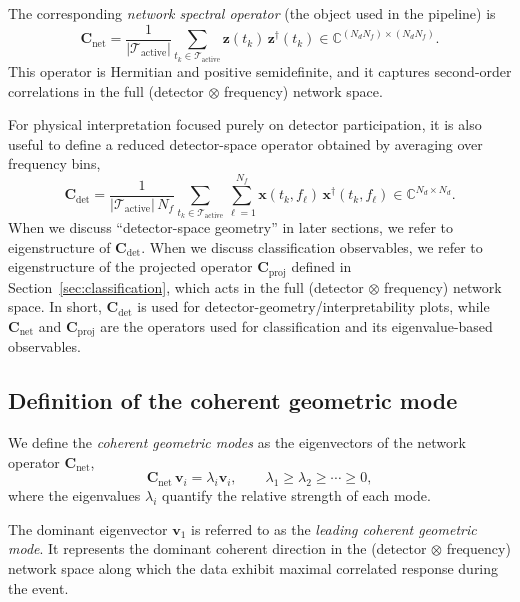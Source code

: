 \documentclass[11pt,a4paper]{article}
\begin{document}
The corresponding \emph{network spectral operator} (the object used in the pipeline) is
\begin{equation}
\mathbf{C}_{\mathrm{net}}
= \frac{1}{|\mathcal{T}_{\mathrm{active}}|}
\sum_{t_k\in\mathcal{T}_{\mathrm{active}}}
\mathbf{z}(t_k)\,\mathbf{z}^\dagger(t_k)
\in \mathbb{C}^{(N_d N_f)\times(N_d N_f)}.
\end{equation}
This operator is Hermitian and positive semidefinite, and it captures second-order correlations in the full (detector $\otimes$ frequency) network space.

For physical interpretation focused purely on detector participation, it is also useful to define a reduced detector-space operator obtained by averaging over frequency bins,
\begin{equation}
\mathbf{C}_{\mathrm{det}}
= \frac{1}{|\mathcal{T}_{\mathrm{active}}|\,N_f}
\sum_{t_k\in\mathcal{T}_{\mathrm{active}}}
\sum_{\ell=1}^{N_f}
\mathbf{x}(t_k,f_\ell)\,\mathbf{x}^\dagger(t_k,f_\ell)
\in \mathbb{C}^{N_d\times N_d}.
\end{equation}
When we discuss ``detector-space geometry'' in later sections, we refer to eigenstructure of $\mathbf{C}_{\mathrm{det}}$.
When we discuss classification observables, we refer to eigenstructure of the projected operator $\mathbf{C}_{\mathrm{proj}}$ defined in Section~\ref{sec:classification}, which acts in the full (detector $\otimes$ frequency) network space.
In short, $\mathbf{C}_{\mathrm{det}}$ is used for detector-geometry/interpretability plots, while $\mathbf{C}_{\mathrm{net}}$ and $\mathbf{C}_{\mathrm{proj}}$ are the operators used for classification and its eigenvalue-based observables.

\subsection{Definition of the coherent geometric mode}

We define the \emph{coherent geometric modes} as the eigenvectors of the network operator $\mathbf{C}_{\mathrm{net}}$,
\begin{equation}
\mathbf{C}_{\mathrm{net}}\,\mathbf{v}_i = \lambda_i \mathbf{v}_i,
\qquad
\lambda_1 \ge \lambda_2 \ge \cdots \ge 0,
\end{equation}
where the eigenvalues $\lambda_i$ quantify the relative strength of each mode.

The dominant eigenvector $\mathbf{v}_1$ is referred to as the \emph{leading coherent geometric mode}.
It represents the dominant coherent direction in the (detector $\otimes$ frequency) network space along which the data exhibit maximal correlated response during the event.
\end{document}
